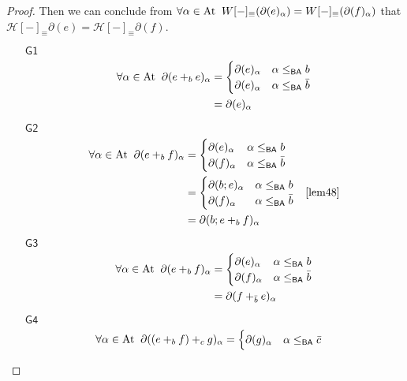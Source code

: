 \documentclass[a4paper,UKenglish,cleveref, autoref, thm-restate]{lipics-v2021}
\newcommand{\At}{\text{\upshape{At}}}
\newcommand{\BA}{\textsf{BA}}
\newcommand{\Ax}[1]{\ensuremath{\mathsf{#1}}}
\theoremstyle{plain}\newtheoremrep{thm}{Theorem}[section]
\begin{document}
\begin{toappendix}
\begin{proof}
			Then we can conclude from $\forall \alpha \in \At \;\; W[-]_\equiv (\partial(e)_\alpha) = W[-]_\equiv (\partial(f)_\alpha)$ that $\mathcal{H}[-]_\equiv\partial(e) = \mathcal{H}[-]_\equiv\partial(f)$.
			\begin{enumerate}
				\item[\Ax{G1}]
				\begin{align*}
					\forall \alpha \in \At\;\;\partial(e+_b e)_\alpha &= 
					\begin{cases}
						\partial(e)_\alpha & \alpha \leq_{\BA} b\\
						\partial(e)_\alpha & \alpha \leq_{\BA} \bar b
					\end{cases}\\
					&= \partial(e)_\alpha
				\end{align*}
				\item[\Ax{G2}]
				\begin{align*}
					\forall \alpha \in \At\;\;\partial(e+_b f)_\alpha
					&= \begin{cases}
						\partial(e)_\alpha & \alpha \leq_{\BA} b\\
						\partial(f)_\alpha & \alpha \leq_{\BA} \bar b
					\end{cases}\\
					&= \begin{cases}
						\partial(b;e)_\alpha & \alpha \leq_{\BA} b\\
						\partial(f)_\alpha & \alpha \leq_{\BA} \bar b
					\end{cases} &\cref{lem48}\\
					&= \partial(b;e +_b f)_\alpha
				\end{align*}
				\item[\Ax{G3}]
				\begin{align*}
					\forall \alpha \in \At\;\;\partial(e+_b f)_\alpha
					&= \begin{cases}
						\partial(e)_\alpha & \alpha \leq_{\BA} b\\
						\partial(f)_\alpha & \alpha \leq_{\BA} \bar b
					\end{cases}\\
					&= \partial(f+_{\bar{b}} e)_\alpha
				\end{align*}
				\item[\Ax{G4}]
				\begin{align*}
					\forall \alpha \in \At\;\;\partial((e+_b f)+_cg)_\alpha &= 
					\begin{cases}
						\partial(g)_\alpha & \alpha \leq_{\BA} \bar c\\

\end{cases}
\end{align*}
\end{enumerate}
\end{proof}
\end{toappendix}
\end{document}
